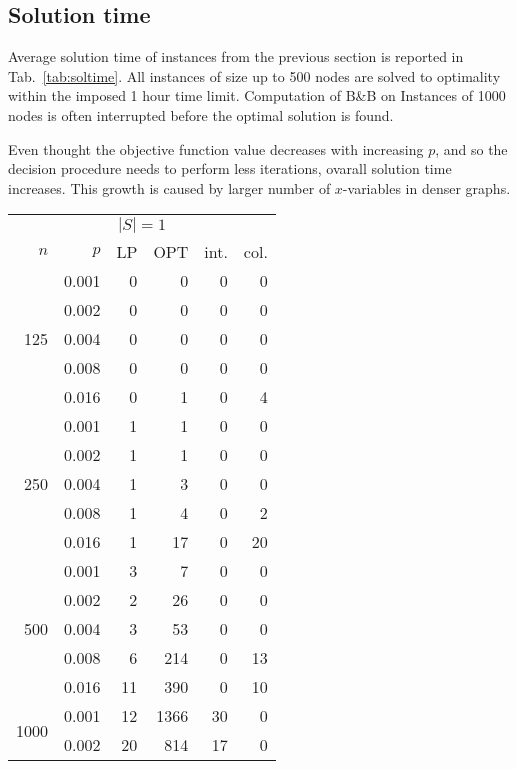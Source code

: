 \subsection{Solution time}

Average solution time of instances from the previous section is reported in Tab.~\ref{tab:soltime}.
All instances of size up to 500 nodes are solved to optimality within the imposed 1 hour time limit.
Computation of B\&B on Instances of 1000 nodes is often interrupted before the optimal solution is found.


Even thought the objective function value decreases with increasing $p$, and so the decision procedure needs to perform less iterations, ovarall solution time increases.
This growth is caused by larger number of $x$-variables in denser graphs.

\begin{table}[]
\begin{minipage}{.45\linewidth}
\begin{tabular}{rrrrrr}
\multicolumn{6}{c}{$|S|=1$} \\
$n$ & $p$ & LP  & OPT & int. & col. \\
\hline
\multirow{5}{*}{125} 
 & 0.001 & 0   &  0 & 0 & 0 \\ 
 & 0.002 & 0   &  0 & 0 & 0 \\
 & 0.004 & 0   &  0 & 0 & 0 \\
 & 0.008 & 0   &  0 & 0 & 0 \\
 & 0.016 & 0   &  1 & 0 & 4 \\
\hline                      
\multirow{5}{*}{250}        
 & 0.001 &  1  &  1 & 0 & 0 \\
 & 0.002 &  1  &  1 & 0 & 0 \\
 & 0.004 &  1  &  3 & 0 & 0 \\
 & 0.008 &  1  &  4 & 0 & 2 \\
 & 0.016 &  1  & 17 & 0 &20 \\
\hline                      
\multirow{5}{*}{500}        
 & 0.001 & 3   &  7 & 0 & 0 \\
 & 0.002 & 2   & 26 & 0 & 0 \\
 & 0.004 & 3   & 53 & 0 & 0 \\
 & 0.008 & 6   &214 & 0 &13 \\
 & 0.016 &11   &390 & 0 &10 \\
\hline                      
\multirow{5}{*}{1000}        
 & 0.001 & 12  &1366& 30& 0 \\
 & 0.002 & 20  & 814& 17& 0 \\

\end{tabular}
\end{minipage}
\end{table}
